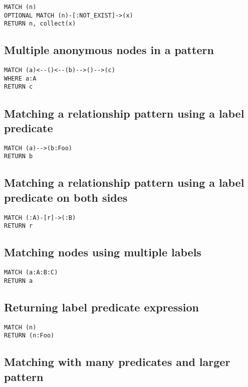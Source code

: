 \begin{lstlisting}
MATCH (n)
OPTIONAL MATCH (n)-[:NOT_EXIST]->(x)
RETURN n, collect(x)
\end{lstlisting}

\subsection{Multiple anonymous nodes in a pattern}

\begin{lstlisting}
MATCH (a)<--()<--(b)-->()-->(c)
WHERE a:A
RETURN c
\end{lstlisting}

\subsection{Matching a relationship pattern using a label predicate}

\begin{lstlisting}
MATCH (a)-->(b:Foo)
RETURN b
\end{lstlisting}

\subsection{Matching a relationship pattern using a label predicate on both sides}

\begin{lstlisting}
MATCH (:A)-[r]->(:B)
RETURN r
\end{lstlisting}

\subsection{Matching nodes using multiple labels}

\begin{lstlisting}
MATCH (a:A:B:C)
RETURN a
\end{lstlisting}

\subsection{Returning label predicate expression}

\begin{lstlisting}
MATCH (n)
RETURN (n:Foo)
\end{lstlisting}

\subsection{Matching with many predicates and larger pattern}


